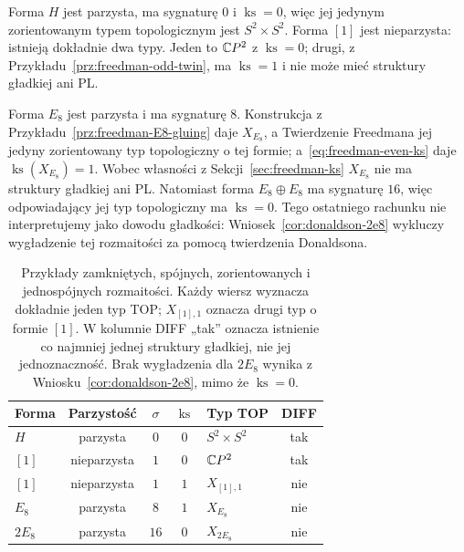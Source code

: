 \begin{przyklad}
\label{prz:freedman-examples}
Forma $H$ jest parzysta, ma sygnaturę $0$ i
$\operatorname{ks}=0$, więc jej jedynym zorientowanym
typem topologicznym jest $S^2\times S^2$.
Forma $[1]$ jest nieparzysta: istnieją dokładnie
dwa typy. Jeden to $\mathbb{C} P^2$ z
$\operatorname{ks}=0$; drugi, z
Przykładu~\ref{prz:freedman-odd-twin}, ma
$\operatorname{ks}=1$ i nie może mieć struktury
gładkiej ani PL.

Forma $E_8$ jest parzysta i ma sygnaturę $8$.
Konstrukcja z Przykładu~\ref{prz:freedman-E8-gluing}
daje $X_{E_8}$, a Twierdzenie Freedmana jej
jedyny zorientowany typ topologiczny o tej formie;
a~\eqref{eq:freedman-even-ks} daje
$\operatorname{ks}(X_{E_8})=1$.
Wobec własności z Sekcji~\ref{sec:freedman-ks}
$X_{E_8}$ nie ma struktury gładkiej ani PL.
Natomiast forma $E_8\oplus E_8$ ma sygnaturę $16$,
więc odpowiadający jej typ topologiczny ma
$\operatorname{ks}=0$. Tego ostatniego rachunku
nie interpretujemy jako dowodu gładkości:
Wniosek~\ref{cor:donaldson-2e8} wykluczy
wygładzenie tej rozmaitości za pomocą
twierdzenia Donaldsona.
\end{przyklad}

\begin{table}[htbp]
\centering
\renewcommand{\arraystretch}{1.12}
\setlength{\tabcolsep}{9pt}
\begin{tabular}{@{}lccclc@{}}
\hline
Forma & Parzystość & $\sigma$ & $\operatorname{ks}$
      & Typ TOP & DIFF \\
\hline
$H$ & parzysta & $0$ & $0$ & $S^2\times S^2$ & tak \\
$[1]$ & nieparzysta & $1$ & $0$ & $\mathbb{C} P^2$ & tak \\
$[1]$ & nieparzysta & $1$ & $1$ & $X_{[1],1}$ & nie \\
$E_8$ & parzysta & $8$ & $1$ & $X_{E_8}$ & nie \\
$2E_8$ & parzysta & $16$ & $0$ & $X_{2E_8}$ & nie \\
\hline
\end{tabular}
\caption{Przykłady zamkniętych, spójnych, zorientowanych
i jednospójnych rozmaitości. Każdy wiersz wyznacza dokładnie
jeden typ TOP; $X_{[1],1}$ oznacza drugi typ o formie $[1]$.
W kolumnie DIFF „tak” oznacza istnienie co najmniej jednej
struktury gładkiej, nie jej jednoznaczność.
Brak wygładzenia dla $2E_8$ wynika z
Wniosku~\ref{cor:donaldson-2e8}, mimo że
$\operatorname{ks}=0$.}
\label{tab:freedman-examples}
\end{table}

